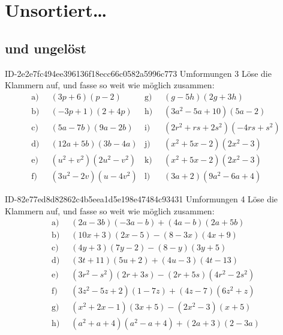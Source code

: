 \setcounter{chapter}{-1}
\chapter{Unsortiert\ldots}

\section{und ungelöst}

\begin{exercise}
      {ID-2e2e7fc494ee396136f18ecc66c0582a5996c773}
      {Umformungen 3}
  \ifproblem\problem
    \newcommand{\gap}{\;\;}%
    Löse die Klammern auf, und fasse so weit wie möglich zusammen:
    \begin{align*}
      \text{a)}\gap & (3p+6)(p-2) &
      \text{g)}\gap & (g-5h)(2g+3h)
      \\
      \text{b)}\gap & (-3p+1)(2+4p) &
      \text{h)}\gap & (3a^2-5a+10)(5a-2)
      \\
      \text{c)}\gap & (5a-7b)(9a-2b) &
      \text{i)}\gap & (2r^2+rs+2s^2)(-4rs+s^2)
      \\
      \text{d)}\gap & (12a+5b)(3b-4a) &
      \text{j)}\gap & (x^2+5x-2)(2x^2-3)
      \\
      \text{e)}\gap & (u^2+v^2)(2u^2-v^2) &
      \text{k)}\gap & (x^2+5x-2)(2x^2-3)
      \\
      \text{f)}\gap & (3u^2-2v)(u-4v^2) &
      \text{l)}\gap & (3a+2)(9a^2-6a+4)
    \end{align*}
  \fi
\end{exercise}

\begin{exercise}
      {ID-82e77ed8d82862c4b5eea1d5e198e47484c93431}
      {Umformungen 4}
  \ifproblem\problem
    \newcommand{\gap}{\;\;}%
    Löse die Klammern auf, und fasse so weit wie möglich zusammen:
    \begin{equation*}
      \begin{split}
        \text{a)}\gap & (2a-3b)(-3a-b)+(4a-b)(2a+5b) \\
        \text{b)}\gap & (10x+3)(2x-5)-(8-3x)(4x+9) \\
        \text{c)}\gap & (4y+3)(7y-2)-(8-y)(3y+5) \\
        \text{d)}\gap & (3t+11)(5u+2)+(4u-3)(4t-13) \\
        \text{e)}\gap & (3r^2-s^2)(2r+3s)-(2r+5s)(4r^2-2s^2) \\
        \text{f)}\gap & (3z^2-5z+2)(1-7z)+(4z-7)(6z^2+z) \\
        \text{g)}\gap & (x^2+2x-1)(3x+5)-(2x^2-3)(x+5) \\
        \text{h)}\gap & (a^2+a+4)(a^2-a+4)+(2a+3)(2-3a)
      \end{split}
    \end{equation*}
  \fi
\end{exercise}


